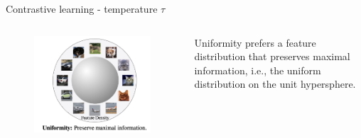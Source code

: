 \documentclass[aspectratio=169,xcolor=dvipsnames]{beamer}
\begin{document}

\begin{frame}{Contrastive learning - temperature $\tau$}
    \begin{columns}
        \begin{column}{0.6\textwidth}
            \begin{figure}
                \centering
                \includegraphics[width=0.8\linewidth]{figures/uniformity.png}
                \label{alignment} 
            \end{figure}
        \end{column}
        \begin{column}{0.3\textwidth}
            Uniformity prefers a feature distribution that preserves maximal information, i.e., the uniform distribution on the unit hypersphere.\\
        \end{column}
    \end{columns}
\end{frame}

\end{document}
